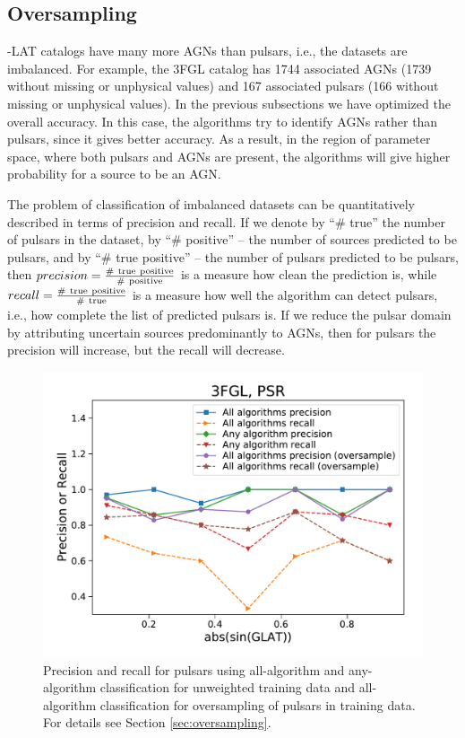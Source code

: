 \subsection{Oversampling}

\Fermi-LAT catalogs have many more AGNs than pulsars, i.e., the datasets are imbalanced.
For example, the 3FGL catalog has 1744 associated AGNs (1739 without missing or unphysical values)
and 167 associated pulsars (166 without missing or unphysical values).
In the previous subsections we have optimized the overall accuracy. In this case, the algorithms try to identify AGNs rather than pulsars,
since it gives better accuracy. As a result, in the region of parameter space, where both pulsars and AGNs are present, the algorithms
will give higher probability for a source to be an AGN.


The problem of classification of imbalanced datasets can be quantitatively described in terms of precision and recall.
If we denote by ``\# true'' the number of pulsars in the dataset, by ``\# positive'' -- the number of sources predicted to be pulsars, and by 
``\# true positive'' -- the number of pulsars predicted to be pulsars, then  $precision \rm = \frac{\#\ true\ positive}{\#\ positive}$ is a measure how clean the prediction is, while $recall \rm = \frac{\#\ true\ positive}{\#\ true}$ is a measure how well the algorithm can detect pulsars, i.e., how complete the list of predicted pulsars is.
If we reduce the pulsar domain by attributing uncertain sources predominantly to AGNs, then for pulsars the precision will increase, but the recall will decrease.



\begin{figure}[h]
\centering
\includegraphics[width=\twopicsp\textwidth]{plots/all_algs_3FGL_precision_recall_oversample_PSR.pdf}
\caption{Precision and recall for pulsars using all-algorithm and any-algorithm classification for unweighted training data and
all-algorithm classification for oversampling of pulsars in training data. For details see Section \ref{sec:oversampling}.}
\label{fig:prec_recall}
\end{figure}


